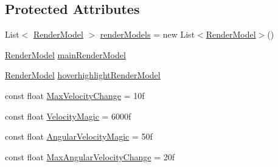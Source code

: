 \subsection*{Protected Attributes}
\begin{DoxyCompactItemize}
\item 
List$<$ \mbox{\hyperlink{class_valve_1_1_v_r_1_1_interaction_system_1_1_render_model}{Render\+Model}} $>$ \mbox{\hyperlink{class_valve_1_1_v_r_1_1_interaction_system_1_1_hand_a2d9cb94fd131d6d802876c7089285089}{render\+Models}} = new List$<$\mbox{\hyperlink{class_valve_1_1_v_r_1_1_interaction_system_1_1_render_model}{Render\+Model}}$>$()
\item 
\mbox{\hyperlink{class_valve_1_1_v_r_1_1_interaction_system_1_1_render_model}{Render\+Model}} \mbox{\hyperlink{class_valve_1_1_v_r_1_1_interaction_system_1_1_hand_a9113cf2e9e54167ac9d88fa7454f5d3f}{main\+Render\+Model}}
\item 
\mbox{\hyperlink{class_valve_1_1_v_r_1_1_interaction_system_1_1_render_model}{Render\+Model}} \mbox{\hyperlink{class_valve_1_1_v_r_1_1_interaction_system_1_1_hand_af738f0e7f0d343d30ea67a3d03c7827e}{hoverhighlight\+Render\+Model}}
\item 
const float \mbox{\hyperlink{class_valve_1_1_v_r_1_1_interaction_system_1_1_hand_a9a4578771a67233b0d2a024a4d55348c}{Max\+Velocity\+Change}} = 10f
\item 
const float \mbox{\hyperlink{class_valve_1_1_v_r_1_1_interaction_system_1_1_hand_a0a383c6f14302a8415b81f1dbc5d9500}{Velocity\+Magic}} = 6000f
\item 
const float \mbox{\hyperlink{class_valve_1_1_v_r_1_1_interaction_system_1_1_hand_ae19a6949e140f556a347a529e3635215}{Angular\+Velocity\+Magic}} = 50f
\item 
const float \mbox{\hyperlink{class_valve_1_1_v_r_1_1_interaction_system_1_1_hand_a3063a358d9e11ceba506db1d3fcff533}{Max\+Angular\+Velocity\+Change}} = 20f
\end{DoxyCompactItemize}
